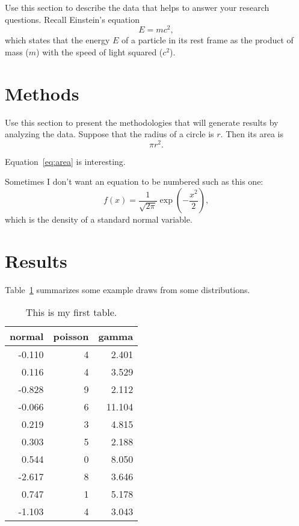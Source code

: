 \documentclass[12pt]{article}
\begin{document}
Use this section to describe the data that helps to answer your research
questions. Recall Einstein's equation
\begin{equation}
  \label{eq:mc2}
  E = m c^2,
\end{equation}
which states that the energy $E$ of a particle in its rest frame as the product
of mass ($m$) with the speed of light squared ($c^2$).

\section{Methods}
\label{sec:meth}

Use this section to present the methodologies that will generate results by
analyzing the data. Suppose that the radius of a circle is $r$. Then its area is
\begin{equation}
  \label{eq:area}
  \pi r^2.
\end{equation}

Equation~\eqref{eq:area} is interesting. \lipsum[1]

Sometimes I don't want an equation to be numbered such as this one:
\[
  f(x) = \frac{1}{\sqrt{2\pi}} \exp\left( - \frac{x^2}{2} \right),
\]
which is the density of a standard normal variable.


\section{Results}
\label{sec:resu}

Table~\ref{tab:rv} summarizes some example draws from some distributions.
\lipsum[1]

\begin{table}[tbp]
  \caption{This is my first table.}
  \label{tab:rv}
\centering
\begin{tabular}{rrr}
  \toprule
normal & poisson & gamma \\ 
  \midrule
-0.110 & 4 & 2.401 \\ 
  0.116 & 4 & 3.529 \\ 
  -0.828 & 9 & 2.112 \\ 
  -0.066 & 6 & 11.104 \\ 
  0.219 & 3 & 4.815 \\ 
  0.303 & 5 & 2.188 \\ 
  0.544 & 0 & 8.050 \\ 
  -2.617 & 8 & 3.646 \\ 
  0.747 & 1 & 5.178 \\ 
  -1.103 & 4 & 3.043 \\ 
   \bottomrule
\end{tabular}
\end{table}
\end{document}
